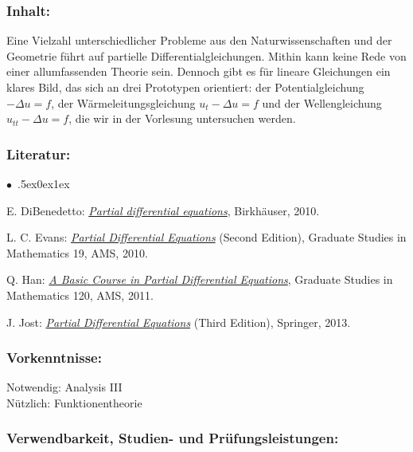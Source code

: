 \documentclass[a4paper,10pt]{article}
\renewenvironment{itemize}{\begin{list}{$\bullet$\ }{\itemsep.5ex\setlength{\topsep}{0.5\itemsep}\parsep0ex\labelsep1ex\settowidth{\labelwidth}{$\bullet$\ }\setlength{\leftmargin}{\labelwidth}\addtolength{\leftmargin}{3ex}\addtolength{\leftmargin}{\labelsep}}}{\end{list}}
\begin{document}
\subsubsection*{\large
    Inhalt:
}
Eine Vielzahl unterschiedlicher Probleme aus den Naturwissenschaften und der Geometrie führt auf partielle Differentialgleichungen. Mithin kann keine Rede von einer allumfassenden Theorie sein. Dennoch gibt es für lineare Gleichungen ein klares Bild, das sich an drei Prototypen orientiert: der Potentialgleichung $-\Delta u = f$, der Wärmeleitungsgleichung $u_t - \Delta u = f$ und der Wellengleichung $u_{tt} - \Delta u = f$, die wir in der Vorlesung untersuchen werden.
\subsubsection*{\large
    Literatur:
}
\begin{itemize}
\item
E. DiBenedetto: \href{https://link.springer.com/book/10.1007/978-0-8176-4552-6}{\emph{Partial differential equations}}, Birkhäuser, 2010. 
\item
L. C. Evans: \href{http://home.ustc.edu.cn/\~xushijie/pdf/textbooks/pde-evans.pdf}{\emph{Partial Differential Equations}} (Second Edition), Graduate Studies in Mathematics 19, AMS, 2010.
\item
Q. Han: \href{https://pdfcoffee.com/a-basic-course-in-partial-differential-equations-qing-han-pdf-free.html}{\emph{A Basic Course in Partial Differential Equations}}, Graduate Studies in Mathematics 120, AMS, 2011. 
\item
J. Jost: \href{http://www.redi-bw.de/start/unifr/EBooks-springer/10.1007/978-1-4614-4809-9}{\emph{Partial Differential Equations}} (Third Edition), Springer, 2013. 
\end{itemize}
\subsubsection*{\large
    Vorkenntnisse:
}
Notwendig: Analysis III \\
Nützlich: Funktionentheorie
\cleardoublepage
\subsubsection*{\large
    Verwendbarkeit, Studien- und Prüfungsleistungen:
}
\end{document}
